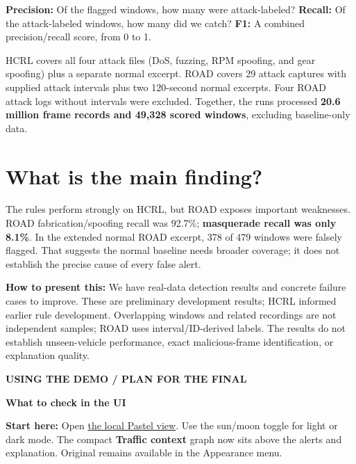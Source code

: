 \documentclass[10pt,letterpaper]{article}
\newcommand{\callout}[2]{\begingroup\setlength{\fboxsep}{10pt}\noindent\colorbox{#1}{\parbox{\dimexpr\linewidth-20pt\relax}{#2}}\endgroup}
\begin{document}
\textbf{Precision:} Of the flagged windows, how many were attack-labeled?\newline
\textbf{Recall:} Of the attack-labeled windows, how many did we catch?\newline
\textbf{F1:} A combined precision/recall score, from 0 to 1.

HCRL covers all four attack files (DoS, fuzzing, RPM spoofing, and gear spoofing) plus a separate normal excerpt. ROAD covers 29 attack captures with supplied attack intervals plus two 120-second normal excerpts. Four ROAD attack logs without intervals were excluded. Together, the runs processed \textbf{20.6 million frame records and 49,328 scored windows}, excluding baseline-only data.

\section{What is the main finding?}
The rules perform strongly on HCRL, but ROAD exposes important weaknesses. ROAD fabrication/spoofing recall was 92.7\%; \textbf{masquerade recall was only 8.1\%}. In the extended normal ROAD excerpt, 378 of 479 windows were falsely flagged. That suggests the normal baseline needs broader coverage; it does not establish the precise cause of every false alert.

\callout{peach}{\textbf{How to present this:} We have real-data detection results and concrete failure cases to improve. These are preliminary development results; HCRL informed earlier rule development. Overlapping windows and related recordings are not independent samples; ROAD uses interval/ID-derived labels. The results do not establish unseen-vehicle performance, exact malicious-frame identification, or explanation quality.}

\newpage
{\small\bfseries\color{sage}USING THE DEMO \quad / \quad PLAN FOR THE FINAL}\par
{\fontsize{23}{27}\selectfont\bfseries What to check in the UI}\par

\callout{palesage}{\textbf{Start here:} Open \href{http://127.0.0.1:5173/?appearance=pastel}{the local Pastel view}. Use the sun/moon toggle for light or dark mode. The compact \textbf{Traffic context} graph now sits above the alerts and explanation. Original remains available in the Appearance menu.}
\end{document}
